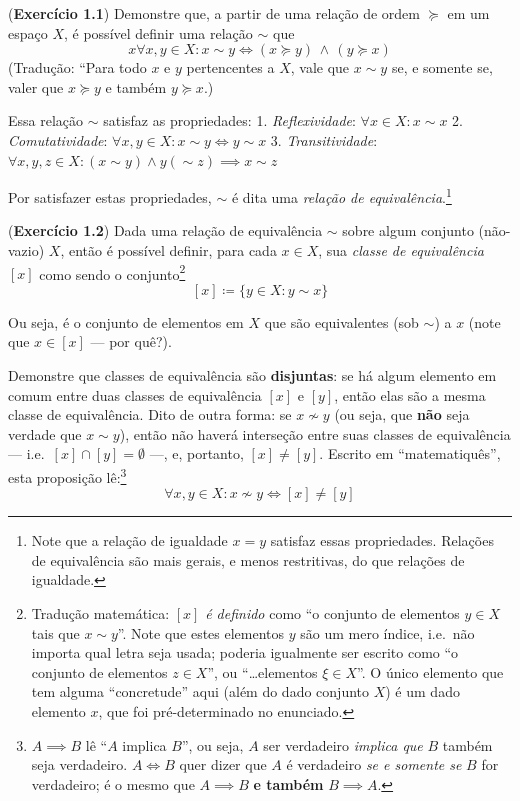 \documentclass[12pt]{article}
\begin{document}
(\textbf{Exercício 1.1}) Demonstre que, a partir de uma relação de ordem
\(\succeq\) em um espaço \(X\), é possível definir uma relação \(\sim\)
que \[x
\forall x, y \in X: x \sim y \iff (x \succeq y)\,  \land  \, (y \succeq x)
\] (Tradução: ``Para todo \(x\) e \(y\) pertencentes a \(X\), vale que
\(x \sim y\) se, e somente se, valer que \(x \succeq y\) e também
\(y \succeq x\).)

Essa relação \(\sim\) satisfaz as propriedades: 1. \emph{Reflexividade}:
\(\forall x \in X: x \sim x\) 2. \emph{Comutatividade}:
\(\forall x, y \in X: x \sim y \iff y \sim x\) 3. \emph{Transitividade}:
\(\forall x, y, z \in X: (x \sim y) \land y( \sim z) \implies x \sim z\)

Por satisfazer estas propriedades, \(\sim\) é dita uma \emph{relação de
equivalência}.\footnote{Note que a relação de igualdade \(x=y\) satisfaz
  essas propriedades. Relações de equivalência são mais gerais, e menos
  restritivas, do que relações de igualdade.}

(\textbf{Exercício 1.2}) Dada uma relação de equivalência \(\sim\) sobre
algum conjunto (não-vazio) \(X\), então é possível definir, para cada
\(x \in X\), sua \emph{classe de equivalência} \([x]\) como sendo o
conjunto\footnote{Tradução matemática: \([x]\) \emph{é definido} como
  ``o conjunto de elementos \(y \in X\) tais que \(x \sim y\)''. Note
  que estes elementos \(y\) são um mero índice, i.e.~não importa qual
  letra seja usada; poderia igualmente ser escrito como ``o conjunto de
  elementos \(z \in X\)'', ou ``\ldots elementos \(\xi \in X\)''. O
  único elemento que tem alguma ``concretude'' aqui (além do dado
  conjunto \(X\)) é um dado elemento \(x\), que foi pré-determinado no
  enunciado.} \[
[x] \coloneqq \{y \in X: y \sim x\}
\]

Ou seja, é o conjunto de elementos em \(X\) que são equivalentes (sob
\(\sim\)) a \(x\) (note que \(x \in [x]\) --- por quê?).

Demonstre que classes de equivalência são \textbf{disjuntas}: se há
algum elemento em comum entre duas classes de equivalência \([x]\) e
\([y]\), então elas são a mesma classe de equivalência. Dito de outra
forma: se \(x \nsim y\) (ou seja, que \textbf{não} seja verdade que
\(x \sim y\)), então não haverá interseção entre suas classes de
equivalência --- i.e.~\([x] \cap [y] = \emptyset\) ---, e, portanto,
\([x] \neq [y]\). Escrito em ``matematiquês'', esta proposição
lê:\footnote{\(A \implies B\) lê ``\(A\) implica \(B\)'', ou seja, \(A\)
  ser verdadeiro \emph{implica que} \(B\) também seja verdadeiro.
  \(A \iff B\) quer dizer que \(A\) é verdadeiro \emph{se e somente se}
  \(B\) for verdadeiro; é o mesmo que \(A \implies B\) \textbf{e também}
  \(B \implies A\).} \[
\forall x, y \in X: x \nsim y \iff [x] \neq [y]
\]
\end{document}
